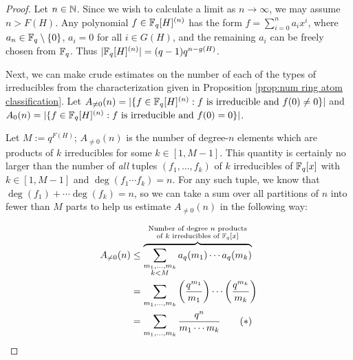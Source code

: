 \begin{proof}
	Let $n\in \mathbb{N}$.
	Since we wish to calculate a limit as $n\to\infty$, we may assume $n> F(H)$.
	Any polynomial $f\in \mathbb{F}_q[H]^{(n)}$ has the form $f = \sum_{i=0}^n a_i x^i$, where $a_n \in \mathbb{F}_q\setminus\{0\}$, $a_i = 0$ for all $i\in G(H)$, and the remaining $a_i$ can be freely chosen from $\mathbb{F}_q$.
	Thus $|\mathbb{F}_q[H]^{(n)}| = (q-1)q^{n-g(H)}$.
	
	Next, we can make crude estimates on the number of each of the types of irreducibles from the characterization given in Proposition \ref{prop:num ring atom classification}.
	Let 
	$A_{\neq0}(n) = | \{f\in \mathbb{F}_q[H]^{(n)}:  f \textrm{ is irreducible and } f(0)\neq 0\}|$ and
	$A_{0}(n) = | \{f\in \mathbb{F}_q[H]^{(n)}:  f \textrm{ is irreducible and } f(0) = 0\}|$.
	
	Let $M := q^{F(H)}$; $A_{\neq0}(n)$ is the number of degree-$n$ elements which are products of $k$ irreducibles for some $k\in [1,M-1]$.
	This quantity is certainly no larger than the number of \textit{all} tuples $(f_1,\dots,f_k)$ of $k$ irreducibles of $\mathbb{F}_q[x]$ with $k\in [1,M-1]$ and $\deg(f_1\cdots f_k) = n$.
	For any such tuple, we know that $\deg(f_1) + \cdots \deg(f_k) = n$, so we can take a sum over all partitions of $n$ into fewer than $M$ parts to help us estimate $A_{\neq0}(n)$ in the following way:
	
	\begin{align*}
	A_{\neq0}(n) &\le 
	\overbrace{\sum_{\substack{m_1,\dots, m_k \\ k < M}} a_q(m_1)\cdots a_q(m_k)}^{\substack{\textrm{Number of degree $n$ products} \\ \textrm{of $k$ irreducibles of $\mathbb{F}_q[x]$}}} \\
	&= \sum_{m_1,\dots,m_k} \left(\frac{q^{m_1}}{m_1}\right)\cdots \left(\frac{q^{m_k}}{m_k}\right) \\
	&=  \sum_{m_1,\dots,m_k} \frac{q^n}{m_1\cdots m_k} \tag{$*$}
	\end{align*}
	

\end{proof}
